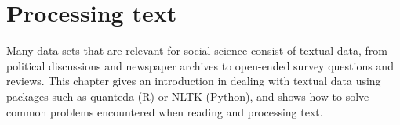 \chapter{Processing text}
\label{chap:protext}

Many data sets that are relevant for social science consist of textual data, from political discussions and newspaper archives to open-ended survey questions and reviews. This chapter gives an introduction in dealing with textual data using packages such as quanteda (R) or NLTK (Python), and shows how to solve common problems encountered when reading and processing text. 







